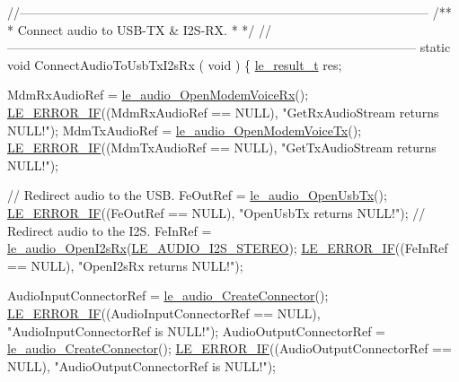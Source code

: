 \begin{DoxyCodeInclude}
{{{{{{{{{{{\textcolor{comment}{//--------------------------------------------------------------------------------------------------}\textcolor{comment}{}
\textcolor{comment}{/**}
\textcolor{comment}{ * Connect audio to USB-TX & I2S-RX.}
\textcolor{comment}{ *}
\textcolor{comment}{ */}
\textcolor{comment}{//--------------------------------------------------------------------------------------------------}
\textcolor{keyword}{static} \textcolor{keywordtype}{void} ConnectAudioToUsbTxI2sRx
(
    \textcolor{keywordtype}{void}
)
\{
    \hyperlink{le__basics_8h_a1cca095ed6ebab24b57a636382a6c86c}{le\_result\_t} res;

    MdmRxAudioRef = \hyperlink{le__audio__interface_8h_ae3ed568ba4d2763ea77e17e77b20ff02}{le\_audio\_OpenModemVoiceRx}();
    \hyperlink{le__log_8h_aceaf11a11691d6c676e36dd317b38dbd}{LE\_ERROR\_IF}((MdmRxAudioRef == NULL), \textcolor{stringliteral}{"GetRxAudioStream returns NULL!"});
    MdmTxAudioRef = \hyperlink{le__audio__interface_8h_ad745f008bb04873c817da7af3daf783d}{le\_audio\_OpenModemVoiceTx}();
    \hyperlink{le__log_8h_aceaf11a11691d6c676e36dd317b38dbd}{LE\_ERROR\_IF}((MdmTxAudioRef == NULL), \textcolor{stringliteral}{"GetTxAudioStream returns NULL!"});

    \textcolor{comment}{// Redirect audio to the USB.}
    FeOutRef = \hyperlink{le__audio__interface_8h_adb38f11ac78cf99160c19f69b4db0eb8}{le\_audio\_OpenUsbTx}();
    \hyperlink{le__log_8h_aceaf11a11691d6c676e36dd317b38dbd}{LE\_ERROR\_IF}((FeOutRef == NULL), \textcolor{stringliteral}{"OpenUsbTx returns NULL!"});
    \textcolor{comment}{// Redirect audio to the I2S.}
    FeInRef = \hyperlink{le__audio__interface_8h_a9e7d0042c4f422554eb10d64535608e5}{le\_audio\_OpenI2sRx}(\hyperlink{le__audio__interface_8h_a94794180ed71a84bd26a1f525858f252a6ce77f5f956b203e15f662900a5103dd}{LE\_AUDIO\_I2S\_STEREO});
    \hyperlink{le__log_8h_aceaf11a11691d6c676e36dd317b38dbd}{LE\_ERROR\_IF}((FeInRef == NULL), \textcolor{stringliteral}{"OpenI2sRx returns NULL!"});

    AudioInputConnectorRef = \hyperlink{le__audio__interface_8h_a570aaf85086f00aca592acfbaaa237be}{le\_audio\_CreateConnector}();
    \hyperlink{le__log_8h_aceaf11a11691d6c676e36dd317b38dbd}{LE\_ERROR\_IF}((AudioInputConnectorRef == NULL), \textcolor{stringliteral}{"AudioInputConnectorRef is NULL!"});
    AudioOutputConnectorRef = \hyperlink{le__audio__interface_8h_a570aaf85086f00aca592acfbaaa237be}{le\_audio\_CreateConnector}();
    \hyperlink{le__log_8h_aceaf11a11691d6c676e36dd317b38dbd}{LE\_ERROR\_IF}((AudioOutputConnectorRef == NULL), \textcolor{stringliteral}{"AudioOutputConnectorRef is NULL!"});

}}}}}}}}}}}
\end{DoxyCodeInclude}
